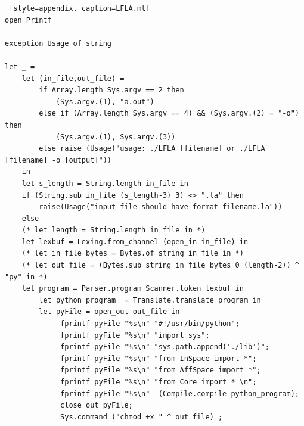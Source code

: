 \documentclass[12pt]{article} %
\begin{document}
\begin{lstlisting} [style=appendix, caption=LFLA.ml]
open Printf

exception Usage of string

let _ =
    let (in_file,out_file) = 
        if Array.length Sys.argv == 2 then 
            (Sys.argv.(1), "a.out")
        else if (Array.length Sys.argv == 4) && (Sys.argv.(2) = "-o") then
            (Sys.argv.(1), Sys.argv.(3))
        else raise (Usage("usage: ./LFLA [filename] or ./LFLA [filename] -o [output]"))
    in
    let s_length = String.length in_file in
    if (String.sub in_file (s_length-3) 3) <> ".la" then 
        raise(Usage("input file should have format filename.la"))
    else
    (* let length = String.length in_file in *)
    let lexbuf = Lexing.from_channel (open_in in_file) in
    (* let in_file_bytes = Bytes.of_string in_file in *)
    (* let out_file = (Bytes.sub_string in_file_bytes 0 (length-2)) ^ "py" in *)
    let program = Parser.program Scanner.token lexbuf in
        let python_program  = Translate.translate program in 
        let pyFile = open_out out_file in
             fprintf pyFile "%s\n" "#!/usr/bin/python";
             fprintf pyFile "%s\n" "import sys";
             fprintf pyFile "%s\n" "sys.path.append('./lib')";
             fprintf pyFile "%s\n" "from InSpace import *";
             fprintf pyFile "%s\n" "from AffSpace import *";
             fprintf pyFile "%s\n" "from Core import * \n";
             fprintf pyFile "%s\n"  (Compile.compile python_program);
             close_out pyFile;
             Sys.command ("chmod +x " ^ out_file) ;
\end{lstlisting}
\end{document}
